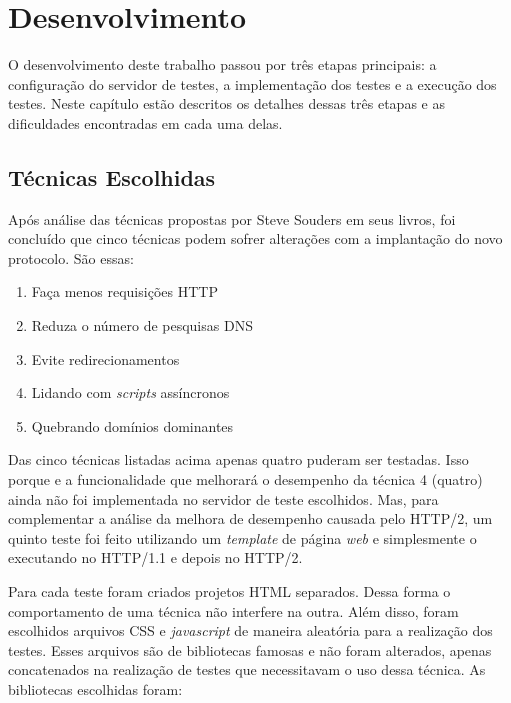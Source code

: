 %
%

\chapter{Desenvolvimento}

O desenvolvimento deste trabalho passou por três etapas principais: a configuração do servidor de testes, a implementação dos testes e a execução dos testes. Neste capítulo estão descritos os detalhes dessas três etapas e as dificuldades encontradas em cada uma delas.

\section{Técnicas Escolhidas}
\label{tecnicasescolhidas}

Após análise das técnicas propostas por Steve Souders em seus livros, foi concluído que cinco técnicas podem sofrer alterações com a implantação do novo protocolo. São essas:

\begin{enumerate}
	\item Faça menos requisições HTTP
	\item Reduza o número de pesquisas DNS
	\item Evite redirecionamentos
	\item Lidando com \textit{scripts} assíncronos
	\item Quebrando domínios dominantes
\end{enumerate}

Das cinco técnicas listadas acima apenas quatro puderam ser testadas. Isso porque e a funcionalidade que melhorará o desempenho da técnica 4 (quatro) ainda não foi implementada no servidor de teste escolhidos. Mas, para complementar a análise da melhora de desempenho causada pelo HTTP/2, um quinto teste foi feito utilizando um \textit{template} de página \textit{web} e simplesmente o executando no HTTP/1.1 e depois no HTTP/2.

Para cada teste foram criados projetos HTML separados. Dessa forma o comportamento de uma técnica não interfere na outra. Além disso, foram escolhidos arquivos CSS e \textit{javascript} de maneira aleatória para a realização dos testes. Esses arquivos são de bibliotecas famosas e não foram alterados, apenas concatenados na realização de testes que necessitavam o uso dessa técnica. As bibliotecas escolhidas foram:

